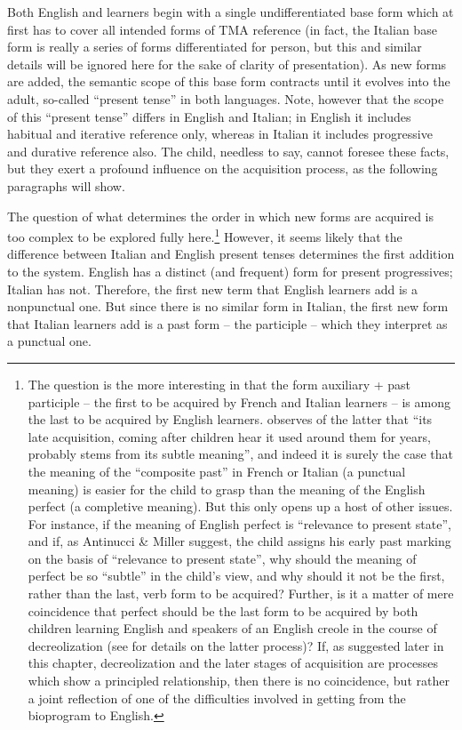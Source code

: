 Both English and  learners begin with a single undifferentiated base form which at first has to cover all intended forms of TMA reference (in fact, the Italian base form is really a series of forms differentiated for person, but this and similar details will be ignored here for the sake of clarity of presentation). As new forms are added, the semantic scope of this base form contracts until it evolves into the adult, so-called ``present tense'' in both languages. Note, however that the scope of this ``present tense'' differs in English and Italian; in English it includes habitual and iterative reference only, whereas in Italian it includes progressive and durative reference also. The child, needless to say, cannot foresee these facts, but they exert a profound influence on the acquisition process, as the following paragraphs will show.

The question of what determines the order in which new forms are acquired is too complex to be explored fully here.\footnote{The question is the more interesting in that the form auxiliary + past participle -- the first to be acquired by French and Italian learners -- is among the last to be acquired by English learners. \citet{Maratsos1979} observes of the latter that ``its late acquisition, coming after children hear it used around them for years, probably stems from its subtle meaning'', and indeed it is surely the case that the meaning of the ``composite past'' in French or Italian (a punctual meaning) is easier for the child to grasp than the meaning of the English perfect (a completive meaning). But this only opens up a host of other issues. For instance, if the meaning of English perfect is ``relevance to present state'', and if, as Antinucci \& Miller suggest, the child assigns his early past marking on the basis of ``relevance to present state'', why should the meaning of perfect be so ``subtle'' in the child's view, and why should it not be the first, rather than the last, verb form to be acquired? Further, is it a matter of mere coincidence that perfect should be the last form to be acquired by both children learning English and speakers of an English creole in the course of decreolization (see \citet[126ff.]{Bickerton1975} for details on the latter process)? If, as suggested later in this chapter, decreolization and the later stages of acquisition are processes which show a principled relationship, then there is no coincidence, but rather a joint reflection of one of the difficulties involved in getting from the bioprogram to English.} However, it seems likely that the difference between Italian and English present tenses determines the first addition to the system. English has a dis\-tinct (and frequent) form for present progressives; Italian has not. Therefore, the first new term that English learners add is a nonpunctual one. But since there is no similar form in Italian, the first new form that Italian learners add is a past form -- the participle -- which they interpret as a punctual one.

